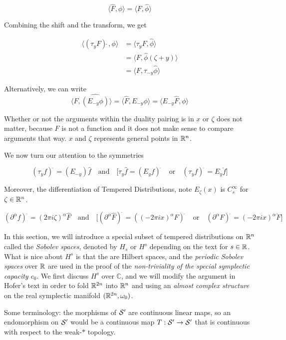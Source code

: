 \documentclass[../main-manifolds.tex]{subfiles}
\begin{document}
{{$$
\langle \hat{F},\phi\rangle = \langle F,\hat{\phi}\rangle
$$

Combining the shift and the transform, we get

$$
\begin{align}
\langle (\tau_y F)\hat{\:}, \phi\rangle &= \langle \tau_y F, \hat{\phi}\rangle \\
&= \langle F, \hat{\phi}(\zeta + y)\rangle \\
&= \langle F, \tau_{-y}\hat{\phi}\rangle 
\end{align}
$$

Alternatively, we can write $$\langle F, \hat{(E_{-y}\phi)}\rangle =\langle\hat{F}, E_{-y}\phi\rangle = \langle E_{-y}\hat{F},\phi\rangle$$

Whether or not the arguments within the duality pairing is in $x$ or $\zeta$ does not matter, because $F$ is not a function and it does not make sense to compare arguments that way. $x$ and $\zeta$ represents general points in ${\mathbb{R}^n}$.

We now turn our attention to the symmetries

$$
(\tau_y f)^\hat{\:} = (E_{-y})\hat{f}\quad\text{and}\quad\biggl[ \tau_y\hat{f} = (E_yf)^\hat{\:}\quad\text{or}\quad (\tau_y f)^\breve{\:} = E_y\breve{f}\biggr]
$$

Moreover, the differentiation of Tempered Distributions, note $E_{\zeta}(x)$ is $C_s^\infty$ for $\zeta\in{\mathbb{R}^n}$.

$$
(\partial^\alpha f)^\hat{\:} = (2\pi i \zeta)^{\alpha}\hat{F}\quad\text{and}\quad \biggl[(\partial^\alpha \hat{F})^{\breve{\:}} = ((-2\pi ix)^{\alpha}F)^{\hat{\:}}\quad\text{or}\quad (\partial^\alpha F)^{\breve{\:}} = (-2\pi i x)^\alpha\breve{F} \biggr]
$$


In this section, we will introduce a special subset of tempered distributions on ${\mathbb{R}^n}$ called the \emph{Sobolev spaces}, denoted by $H_s$ or $H^s$ depending on the text for $s\in\mathbb{R}$. What is nice about $H^s$ is that the are Hilbert spaces, and the \emph{periodic Sobolev spaces} over $\mathbb{R}$ are used in the proof of the \emph{non-triviality of the special symplectic capacity $c_0$}. We first discuss $H^s$ over $\mathbb{C}$, and we will modify the argument in Hofer's text in order to fold $\mathbb{R}^{2n}$ into ${\mathbb{R}^n}$ and using an \emph{almost complex structure} on the real symplectic manifold $(\mathbb{R}^{2n},\omega_0)$.


Some terminology: the morphisms of $\mathcal{S}'$ are continuous linear maps, so an endomorphism on $\mathcal{S}'$ would be a continuous map $T: \mathcal{S}'\to\mathcal{S}'$ that is continuous with respect to the weak-$\ast$ topology.

}}
\end{document}
